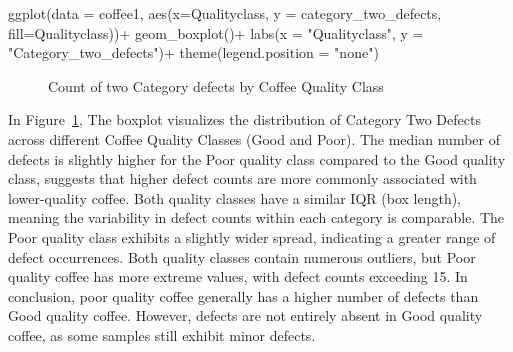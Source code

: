\documentclass[
  letterpaper,
  DIV=11,
  numbers=noendperiod]{scrartcl}
\newenvironment{Shaded}{\begin{snugshade}}{\end{snugshade}}
\newcommand{\AttributeTok}[1]{\textcolor[rgb]{0.40,0.45,0.13}{#1}}
\newcommand{\FunctionTok}[1]{\textcolor[rgb]{0.28,0.35,0.67}{#1}}
\newcommand{\NormalTok}[1]{\textcolor[rgb]{0.00,0.23,0.31}{#1}}
\newcommand{\SpecialCharTok}[1]{\textcolor[rgb]{0.37,0.37,0.37}{#1}}
\newcommand{\StringTok}[1]{\textcolor[rgb]{0.13,0.47,0.30}{#1}}
\begin{document}
\begin{Shaded}
\begin{Highlighting}[]
\FunctionTok{ggplot}\NormalTok{(}\AttributeTok{data =}\NormalTok{ coffee1, }\FunctionTok{aes}\NormalTok{(}\AttributeTok{x=}\NormalTok{Qualityclass, }
                           \AttributeTok{y =}\NormalTok{ category\_two\_defects, }
                           \AttributeTok{fill=}\NormalTok{Qualityclass))}\SpecialCharTok{+}
  \FunctionTok{geom\_boxplot}\NormalTok{()}\SpecialCharTok{+}
  \FunctionTok{labs}\NormalTok{(}\AttributeTok{x =} \StringTok{"Qualityclass"}\NormalTok{, }\AttributeTok{y =} \StringTok{"Category\_two\_defects"}\NormalTok{)}\SpecialCharTok{+}
  \FunctionTok{theme}\NormalTok{(}\AttributeTok{legend.position =} \StringTok{"none"}\NormalTok{)}
\end{Highlighting}
\end{Shaded}

\begin{figure}[H]


\caption{\label{fig-boxplot4}Count of two Category defects by Coffee
Quality Class}

\end{figure}%

In Figure~\ref{fig-boxplot4}, The boxplot visualizes the distribution of
Category Two Defects across different Coffee Quality Classes (Good and
Poor). The median number of defects is slightly higher for the Poor
quality class compared to the Good quality class, suggests that higher
defect counts are more commonly associated with lower-quality coffee.
Both quality classes have a similar IQR (box length), meaning the
variability in defect counts within each category is comparable. The
Poor quality class exhibits a slightly wider spread, indicating a
greater range of defect occurrences. Both quality classes contain
numerous outliers, but Poor quality coffee has more extreme values, with
defect counts exceeding 15. In conclusion, poor quality coffee generally
has a higher number of defects than Good quality coffee. However,
defects are not entirely absent in Good quality coffee, as some samples
still exhibit minor defects.
\end{document}
